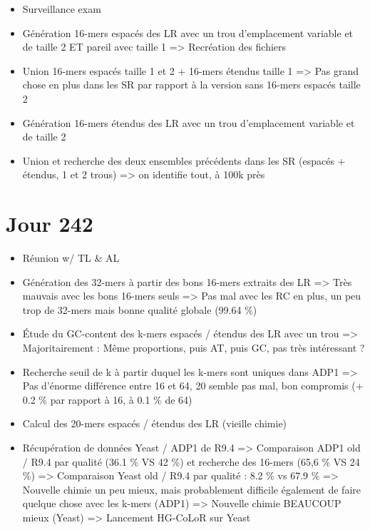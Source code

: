 \documentclass[12pt]{report}
\begin{document}
\begin{itemize}
	\item Surveillance exam
	
	\item Génération 16-mers espacés des LR avec un trou d'emplacement variable et de taille 2 ET pareil avec taille 1
		  => Recréation des fichiers
		  
	\item Union 16-mers espacés taille 1 et 2 + 16-mers étendus taille 1 => Pas grand chose en plus dans les SR
		  par rapport à la version sans 16-mers espacés taille 2
	
	\item Génération 16-mers étendus des LR avec un trou d'emplacement variable et de taille 2
	
	\item Union et recherche des deux ensembles précédents dans les SR (espacés + étendus, 1 et 2 trous)
		  => on identifie tout, à 100k près
\end{itemize}

\section{Jour 242}

\begin{itemize}
	\item Réunion w/ TL \& AL
	
	\item Génération des 32-mers à partir des bons 16-mers extraits des LR
		  => Très mauvais avec les bons 16-mers seuls
		  => Pas mal avec les RC en plus, un peu trop de 32-mers mais bonne qualité globale (99.64 \%)
		  
	\item Étude du GC-content des k-mers espacés / étendus des LR avec un trou
		  => Majoritairement : Même proportions, puis AT, puis GC, pas très intéressant ?
		  
	\item Recherche seuil de k à partir duquel les k-mers sont uniques dans ADP1
		  => Pas d'énorme différence entre 16 et 64, 20 semble pas mal, bon compromis (+ 0.2 \% par rapport à 16, à 0.1 \% de 64)
		  
	\item Calcul des 20-mers espacés / étendus des LR (vieille chimie)
	
	\item Récupération de données Yeast / ADP1 de R9.4
		  => Comparaison ADP1 old / R9.4 par qualité (36.1 \% VS 42 \%) et recherche des 16-mers (65,6 \% VS 24 \%)
		  => Comparaison Yeast old / R9.4 par qualité : 8.2 \% vs 67.9 \%
		  => Nouvelle chimie un peu mieux, mais probablement difficile également de faire quelque chose avec les k-mers (ADP1)
		  => Nouvelle chimie BEAUCOUP mieux (Yeast)
		  => Lancement HG-CoLoR sur Yeast
\end{itemize}
\end{document}
